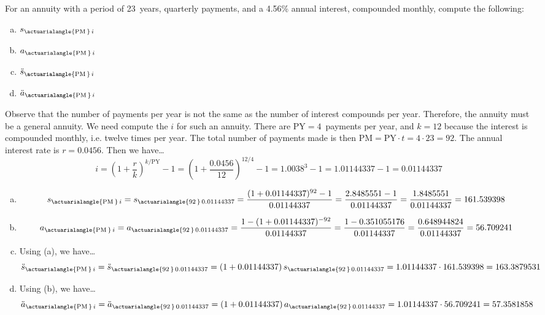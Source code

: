 \documentclass[11pt,letterpaper]{article}
\begin{document}

 For an annuity with a period of 23~years, quarterly payments, and a 4.56\% annual interest, compounded monthly, compute the following:
	\begin{enumerate}[(a)]
	\item $s_{\actuarialangle{\text{PM}\,}\, i}$
	\item $a_{\actuarialangle{\text{PM}\,}\, i}$
	\item $\ddot{s}_{\actuarialangle{\text{PM}\,}\, i}$
	\item $\ddot{a}_{\actuarialangle{\text{PM}\,}\, i}$
	\end{enumerate} \pspace

\sol Observe that the number of payments per year is not the same as the number of interest compounds per year. Therefore, the annuity must be a general annuity. We need compute the $i$ for such an annuity. There are $\text{PY}= 4$~payments per year, and $k= 12$ because the interest is compounded monthly, i.e. twelve times per year. The total number of payments made is then $\text{PM}= \text{PY} \cdot t= 4 \cdot 23= 92$. The annual interest rate is $r= 0.0456$. Then we have\dots
	\[
	i= \left(1 + \dfrac{r}{k} \right)^{k/\text{PY}} - 1= \left(1 + \dfrac{0.0456}{12} \right)^{12/4} - 1= 1.0038^3 - 1= 1.01144337 - 1= 0.01144337
	\] \pspace

\begin{enumerate}[(a)]
\item 
	\[
	s_{\actuarialangle{\text{PM}\,}\, i}= s_{\actuarialangle{92\,}\, 0.01144337}= \dfrac{(1 + 0.01144337)^{92} - 1}{0.01144337}= \dfrac{2.8485551 - 1}{0.01144337}= \dfrac{1.8485551}{0.01144337}= 161.539398
	\] \pspace

\item 
	\[
	a_{\actuarialangle{\text{PM}\,}\, i}= a_{\actuarialangle{92\,}\, 0.01144337}= \dfrac{1 - (1 + 0.01144337)^{-92}}{0.01144337}= \dfrac{1 - 0.351055176}{0.01144337}= \dfrac{0.648944824}{0.01144337}= 56.709241
	\] \pspace

\item Using (a), we have\dots
	\[
	\ddot{s}_{\actuarialangle{\text{PM}\,}\, i}= \ddot{s}_{\actuarialangle{92\,}\, 0.01144337}= (1 + 0.01144337)\, s_{\actuarialangle{92\,}\, 0.01144337}= 1.01144337 \cdot 161.539398= 163.3879531
	\] \pspace

\item Using (b), we have\dots
	\[
	\ddot{a}_{\actuarialangle{\text{PM}\,}\, i}= \ddot{a}_{\actuarialangle{92\,}\, 0.01144337}= (1 + 0.01144337)\, a_{\actuarialangle{92\,}\, 0.01144337}= 1.01144337 \cdot 56.709241= 57.3581858
	\]
\end{enumerate}
\end{document}
